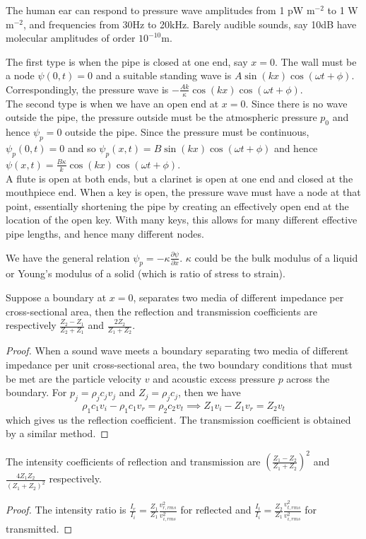\documentclass[a4paper]{article}
\begin{document}
\begin{eg}
The human ear can respond to pressure wave amplitudes from 1 pW m$^{-2}$ to 1 W m$^{-2}$, and frequencies from 30Hz to 20kHz. Barely audible sounds, say 10dB have molecular amplitudes of order $10^{-10}$m.
\end{eg}
\begin{eg}
The first type is when the pipe is closed at one end, say $x=0$. The wall must be a node $\psi(0,t)=0$ and a suitable standing wave is $A\sin(kx)\cos(\omega t+\phi)$. Correspondingly, the pressure wave is $-\frac{Ak}{\kappa}\cos(kx)\cos(\omega t+\phi)$.\\[5pt]
The second type is when we have an open end at $x=0$. Since there is no wave outside the pipe, the pressure outside must be the atmospheric pressure $p_0$ and hence $\psi_p=0$ outside the pipe. Since the pressure must be continuous, $\psi_p(0,t)=0$ and so $\psi_p(x,t)=B\sin(kx)\cos(\omega t+\phi)$ and hence $\psi(x,t)=\frac{B\kappa}{k}\cos(kx)\cos(\omega t+\phi)$.\\[5pt]
A flute is open at both ends, but a clarinet is open at one end and closed at the mouthpiece end. When a key is open, the pressure wave must have a node at that point, essentially shortening the pipe by creating an effectively open end at the location of the open key. With many keys, this allows for many different effective pipe lengths, and hence many different nodes.
\end{eg}
\begin{Note}
We have the general relation $\psi_p=-\kappa\frac{\partial\psi}{\partial x}$. $\kappa$ could be the bulk modulus of a liquid or Young's modulus of a solid (which is ratio of stress to strain).
\end{Note}
\begin{thm}
Suppose a boundary at $x=0$, separates two media of different impedance per cross-sectional area, then the reflection and transmission coefficients are respectively $\frac{Z_2-Z_1}{Z_2+Z_1}$ and $\frac{2Z_2}{Z_1+Z_2}$. 
\end{thm}
\begin{proof}
When a sound wave meets a boundary separating two media of different impedance per unit cross-sectional area, the two boundary conditions that must be met are the particle velocity $v$ and acoustic excess pressure $p$ across the boundary. For $p_j=\rho_jc_jv_j$ and $Z_j=\rho_jc_j$, then we have 
$$\rho_1c_1v_i-\rho_1c_1v_r=\rho_2c_2v_t\implies Z_1v_i-Z_1v_r=Z_2v_t$$
which gives us the reflection coefficient. The transmission coefficient is obtained by a similar method.
\end{proof}
\begin{cor}
The intensity coefficients of reflection and transmission are $(\frac{Z_1-Z_2}{Z_1+Z_2})^2$ and $\frac{4Z_1Z_2}{(Z_1+Z_2)^2}$ respectively.
\end{cor}
\begin{proof}
The intensity ratio is $\frac{I_r}{I_i}=\frac{Z_1}{Z_1}\frac{v_{r,rms}^2}{v_{i,rms}^2}$ for reflected and $\frac{I_t}{I_i}=\frac{Z_2}{Z_1}\frac{v_{t,rms}^2}{v_{i,rms}^2}$ for transmitted.
\end{proof}
\newpage
\end{document}
